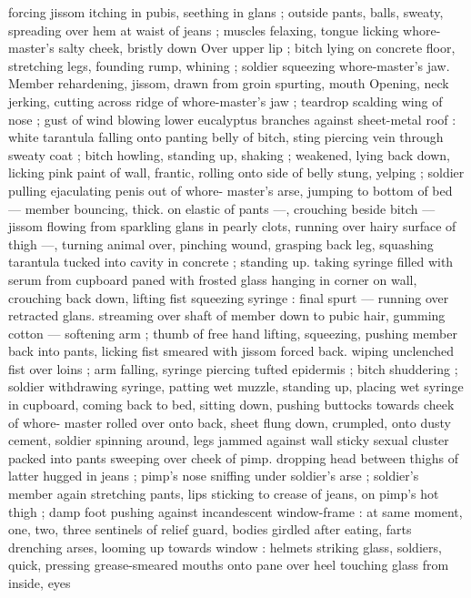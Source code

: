 {forcing jissom itching in pubis, seething in glans ; outside pants, 
balls, sweaty, spreading over hem at waist of jeans ; muscles 
felaxing, tongue licking whore-master's salty cheek, bristly down 
Over upper lip ; bitch lying on concrete floor, stretching legs, 
founding rump, whining ; soldier squeezing whore-master's jaw. 
Member rehardening, jissom, drawn from groin spurting, mouth 
Opening, neck jerking, cutting across ridge of whore-master's jaw ; 
teardrop scalding wing of nose ; gust of wind blowing lower 
eucalyptus branches against sheet-metal roof : white tarantula 
falling onto panting belly of bitch, sting piercing vein through sweaty 
coat ; bitch howling, standing up, shaking ; weakened, lying back 
down, licking pink paint of wall, frantic, rolling onto side of belly 
stung, yelping ; soldier pulling ejaculating penis out of whore- 
master's arse, jumping to bottom of bed --- member bouncing, thick. 
on elastic of pants ---, crouching beside bitch --- jissom flowing from 
sparkling glans in pearly clots, running over hairy surface of thigh 
---, turning animal over, pinching wound, grasping back leg, 
squashing tarantula tucked into cavity in concrete ; standing up. 
taking syringe filled with serum from cupboard paned with frosted 
glass hanging in corner on wall, crouching back down, lifting fist 
squeezing syringe : final spurt --- running over retracted glans. 
streaming over shaft of member down to pubic hair, gumming cotton 
--- softening arm ; thumb of free hand lifting, squeezing, pushing 
member back into pants, licking fist smeared with jissom forced back. 
wiping unclenched fist over loins ; arm falling, syringe piercing tufted 
epidermis ; bitch shuddering ; soldier withdrawing syringe, patting 
wet muzzle, standing up, placing wet syringe in cupboard, coming 
back to bed, sitting down, pushing buttocks towards cheek of whore- 
master rolled over onto back, sheet flung down, crumpled, onto 
dusty cement, soldier spinning around, legs jammed against wall 
sticky sexual cluster packed into pants sweeping over cheek of pimp. 
dropping head between thighs of latter hugged in jeans ; pimp's 
nose sniffing under soldier's arse ; soldier's member again 
stretching pants, lips sticking to crease of jeans, on pimp's hot thigh 
; damp foot pushing against incandescent window-frame : at same 
moment, one, two, three sentinels of relief guard, bodies girdled 
after eating, farts drenching arses, looming up towards window : 
helmets striking glass, soldiers, quick, pressing grease-smeared 
mouths onto pane over heel touching glass from inside, eyes 
}
